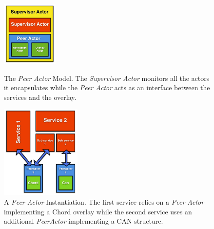\begin{figure}
\vspace*{-.5cm}
  \begin{minipage}[c]{.35\linewidth}
	\vspace*{.5cm}
   \hspace*{-0.5cm}
      	\centering \includegraphics[width=2.8cm]{./FIGS/PeerActor.pdf}
   \hspace*{0.5cm}
	\vspace*{.5cm}
		\caption{The \emph{Peer Actor} Model. The \emph{Supervisor Actor} monitors all the actors it encapsulates while the \emph{Peer Actor} acts as an interface between the services and the overlay.}
\label{fig:supervisor}
   \end{minipage}
\hspace*{0.6cm}
   \begin{minipage}[c]{.55\linewidth}
   	\centering \includegraphics[width=4cm]{./FIGS/PeerActorServices.pdf}
	\vspace*{-0.25cm}
		\caption{A \emph{Peer Actor} Instantiation. The first service relies on a \emph{Peer Actor} implementing a Chord
overlay while the second service uses an additional \emph{PeerActor} implementing a CAN structure.}
		\label{fig:peeractor} 
  \end{minipage} \hfill
	\vspace*{-0.4cm}
\end{figure}

